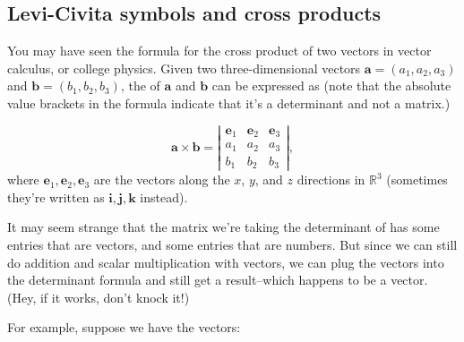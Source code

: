 

\subsection{Levi-Civita symbols and cross products}

You may have seen the formula for the cross product of two vectors in vector calculus, or college physics. Given two three-dimensional vectors $\textbf{a}=(a_1, a_2, a_3)$ and $\textbf{b}=(b_1, b_2, b_3)$, the  of $\textbf{a}$ and $\textbf{b}$ can be expressed as  (note that the absolute value brackets in the formula  indicate that it's a determinant and not a matrix.)

\[ \textbf{a} \times \textbf{b}=
 \left| \begin{array}{ccc}
\textbf{e}_1 & \textbf{e}_2  & \textbf{e}_3  \\
a_1 & a_2 & a_3 \\
b_1 & b_2 & b_3 \end{array} \right|,\]
where $\textbf{e}_1,  \textbf{e}_2 , \textbf{e}_3$ are the vectors along the $x$, $y$, and $z$ directions  in $\mathbb{R}^3$ (sometimes they're written as $\textbf{i}, \textbf{j}, \textbf{k}$ instead).

It may seem strange that the matrix we're taking the determinant of has some entries that are vectors, and some entries that are numbers. But since we can still do addition and scalar multiplication with vectors, we can plug the vectors into the determinant formula and still get a result--which happens to be a vector. (Hey, if it works, don't knock it!)

For example, suppose we have the vectors:

